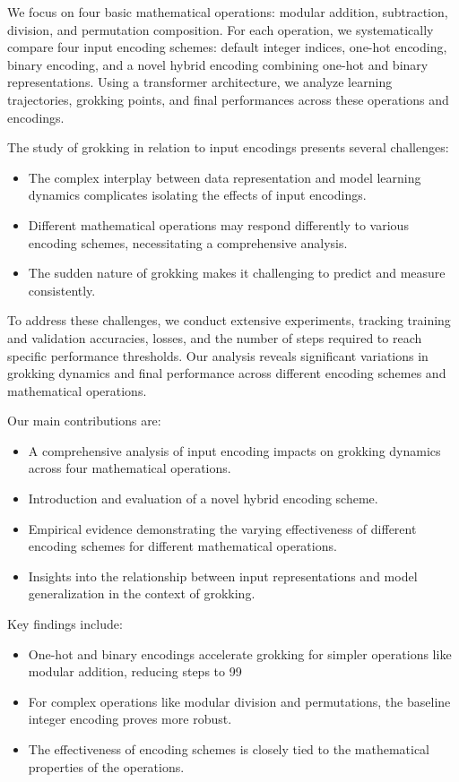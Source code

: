\documentclass{article} %
\begin{document}
We focus on four basic mathematical operations: modular addition, subtraction, division, and permutation composition. For each operation, we systematically compare four input encoding schemes: default integer indices, one-hot encoding, binary encoding, and a novel hybrid encoding combining one-hot and binary representations. Using a transformer architecture, we analyze learning trajectories, grokking points, and final performances across these operations and encodings.

The study of grokking in relation to input encodings presents several challenges:
\begin{itemize}
    \item The complex interplay between data representation and model learning dynamics complicates isolating the effects of input encodings.
    \item Different mathematical operations may respond differently to various encoding schemes, necessitating a comprehensive analysis.
    \item The sudden nature of grokking makes it challenging to predict and measure consistently.
\end{itemize}

To address these challenges, we conduct extensive experiments, tracking training and validation accuracies, losses, and the number of steps required to reach specific performance thresholds. Our analysis reveals significant variations in grokking dynamics and final performance across different encoding schemes and mathematical operations.

Our main contributions are:
\begin{itemize}
    \item A comprehensive analysis of input encoding impacts on grokking dynamics across four mathematical operations.
    \item Introduction and evaluation of a novel hybrid encoding scheme.
    \item Empirical evidence demonstrating the varying effectiveness of different encoding schemes for different mathematical operations.
    \item Insights into the relationship between input representations and model generalization in the context of grokking.
\end{itemize}

Key findings include:
\begin{itemize}
    \item One-hot and binary encodings accelerate grokking for simpler operations like modular addition, reducing steps to 99%
    \item For complex operations like modular division and permutations, the baseline integer encoding proves more robust.
    \item The effectiveness of encoding schemes is closely tied to the mathematical properties of the operations.
\end{itemize}
\end{document}
